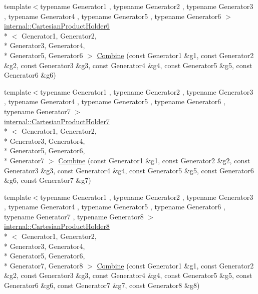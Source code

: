 \begin{DoxyCompactItemize}
{\footnotesize template$<$typename Generator1 , typename Generator2 , typename Generator3 , typename Generator4 , typename Generator5 , typename Generator6 $>$ }\\\hyperlink{classtesting_1_1internal_1_1_cartesian_product_holder6}{internal\-::\-Cartesian\-Product\-Holder6}\\*
$<$ Generator1, Generator2, \\*
Generator3, Generator4, \\*
Generator5, Generator6 $>$ \hyperlink{namespacetesting_adccda33f9b3ad18896cb341979fe12b4}{Combine} (const Generator1 \&g1, const Generator2 \&g2, const Generator3 \&g3, const Generator4 \&g4, const Generator5 \&g5, const Generator6 \&g6)
\item 
{\footnotesize template$<$typename Generator1 , typename Generator2 , typename Generator3 , typename Generator4 , typename Generator5 , typename Generator6 , typename Generator7 $>$ }\\\hyperlink{classtesting_1_1internal_1_1_cartesian_product_holder7}{internal\-::\-Cartesian\-Product\-Holder7}\\*
$<$ Generator1, Generator2, \\*
Generator3, Generator4, \\*
Generator5, Generator6, \\*
Generator7 $>$ \hyperlink{namespacetesting_a314759a93c251ca78b75c7f3ae8eda80}{Combine} (const Generator1 \&g1, const Generator2 \&g2, const Generator3 \&g3, const Generator4 \&g4, const Generator5 \&g5, const Generator6 \&g6, const Generator7 \&g7)
\item 
{\footnotesize template$<$typename Generator1 , typename Generator2 , typename Generator3 , typename Generator4 , typename Generator5 , typename Generator6 , typename Generator7 , typename Generator8 $>$ }\\\hyperlink{classtesting_1_1internal_1_1_cartesian_product_holder8}{internal\-::\-Cartesian\-Product\-Holder8}\\*
$<$ Generator1, Generator2, \\*
Generator3, Generator4, \\*
Generator5, Generator6, \\*
Generator7, Generator8 $>$ \hyperlink{namespacetesting_ac5508abb9d05e22332c792d101c13b2b}{Combine} (const Generator1 \&g1, const Generator2 \&g2, const Generator3 \&g3, const Generator4 \&g4, const Generator5 \&g5, const Generator6 \&g6, const Generator7 \&g7, const Generator8 \&g8)
\item 

\end{DoxyCompactItemize}
